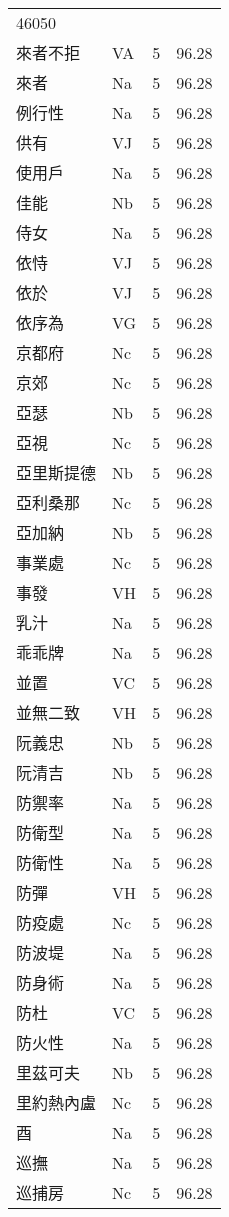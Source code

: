 \documentclass[twocolumn]{book}
\begin{document}
\begin{supertabular}{llrr}
46050\\
來者不拒 & VA & 5 &  96.28\\
來者 & Na & 5 &  96.28\\
例行性 & Na & 5 &  96.28\\
供有 & VJ & 5 &  96.28\\
使用戶 & Na & 5 &  96.28\\
佳能 & Nb & 5 &  96.28\\
侍女 & Na & 5 &  96.28\\
依恃 & VJ & 5 &  96.28\\
依於 & VJ & 5 &  96.28\\
依序為 & VG & 5 &  96.28\\
京都府 & Nc & 5 &  96.28\\
京郊 & Nc & 5 &  96.28\\
亞瑟 & Nb & 5 &  96.28\\
亞視 & Nc & 5 &  96.28\\
亞里斯提德 & Nb & 5 &  96.28\\
亞利桑那 & Nc & 5 &  96.28\\
亞加納 & Nb & 5 &  96.28\\
事業處 & Nc & 5 &  96.28\\
事發 & VH & 5 &  96.28\\
乳汁 & Na & 5 &  96.28\\
乖乖牌 & Na & 5 &  96.28\\
並置 & VC & 5 &  96.28\\
並無二致 & VH & 5 &  96.28\\
阮義忠 & Nb & 5 &  96.28\\
阮清吉 & Nb & 5 &  96.28\\
防禦率 & Na & 5 &  96.28\\
防衛型 & Na & 5 &  96.28\\
防衛性 & Na & 5 &  96.28\\
防彈 & VH & 5 &  96.28\\
防疫處 & Nc & 5 &  96.28\\
防波堤 & Na & 5 &  96.28\\
防身術 & Na & 5 &  96.28\\
防杜 & VC & 5 &  96.28\\
防火性 & Na & 5 &  96.28\\
里茲可夫 & Nb & 5 &  96.28\\
里約熱內盧 & Nc & 5 &  96.28\\
酉 & Na & 5 &  96.28\\
巡撫 & Na & 5 &  96.28\\
巡捕房 & Nc & 5 &  96.28\\

\end{supertabular}
\end{document}
